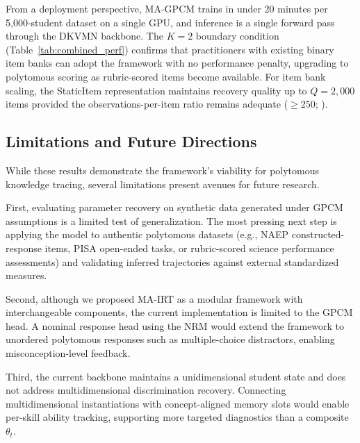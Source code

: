 \documentclass[pdflatex,sn-apa]{sn-jnl}
\begin{document}
From a deployment perspective, MA-GPCM trains in under 20 minutes per 5{,}000-student dataset on a single GPU, and inference is a single forward pass through the DKVMN backbone. The $K=2$ boundary condition (Table~\ref{tab:combined_perf}) confirms that practitioners with existing binary item banks can adopt the framework with no performance penalty, upgrading to polytomous scoring as rubric-scored items become available. For item bank scaling, the StaticItem representation maintains recovery quality up to $Q = 2{,}000$ items provided the observations-per-item ratio remains adequate ($\geq 250$; \citealt{de_ayala_theory_2009}).

\subsection{Limitations and Future Directions}
\label{sec:limitations}
While these results demonstrate the framework's viability for polytomous knowledge tracing, several limitations present avenues for future research.

First, evaluating parameter recovery on synthetic data generated under GPCM assumptions is a limited test of generalization. The most pressing next step is applying the model to authentic polytomous datasets (e.g., NAEP constructed-response items, PISA open-ended tasks, or rubric-scored science performance assessments) and validating inferred trajectories against external standardized measures.

Second, although we proposed MA-IRT as a modular framework with interchangeable components, the current implementation is limited to the GPCM head. A nominal response head using the NRM \citep{bock_estimating_1972} would extend the framework to unordered polytomous responses such as multiple-choice distractors, enabling misconception-level feedback.

Third, the current backbone maintains a unidimensional student state and does not address multidimensional discrimination recovery. Connecting multidimensional instantiations with concept-aligned memory slots would enable per-skill ability tracking, supporting more targeted diagnostics than a composite $\theta_t$.
\end{document}
